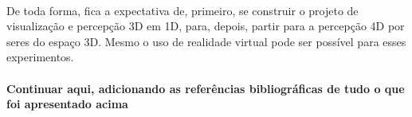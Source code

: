 \documentclass{article}
\begin{document}
	\paragraph{}
	De toda forma, fica a expectativa de, primeiro, se construir o projeto de visualização e percepção 3D em 1D, para, depois, partir para a percepção 4D por seres do espaço 3D. Mesmo o uso de realidade virtual pode ser possível para esses experimentos.
		
	
	
	
	\paragraph{}
	\textbf{Continuar aqui, adicionando as referências bibliográficas de tudo o que foi apresentado acima}
\end{document}
